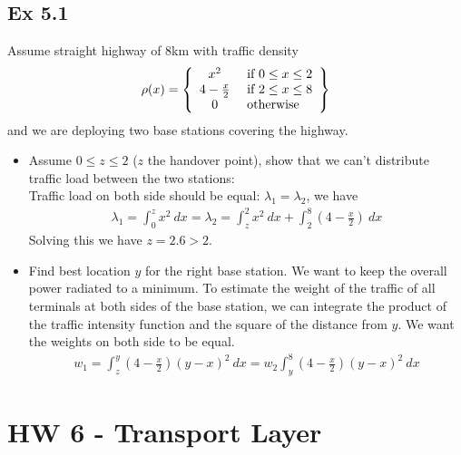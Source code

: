 \subsection*{Ex 5.1}
Assume straight highway of 8km with traffic density
\begin{align*}
 	\rho(x) = 
 		\left\{
 			\begin{array}{c l}
 				x^2 & \text{ if } 0 \leq x \leq 2 \\
 				4 - \frac{x}{2} & \text{ if } 2 \leq x \leq 8 \\
 				0 & \text{ otherwise} 
 			\end{array}
 		\right\}
 \end{align*} 
 and we are deploying two base stations covering the highway.
 \begin{itemize}
 	\item Assume $0 \leq z \leq 2$ ($z$ the handover point), show that we can't distribute traffic load between the two stations: \\
 	Traffic load on both side should be equal: $\lambda_1 = \lambda_2$, we have
 	\begin{align*}
 		\lambda_1 = \int_0^z x^2 \: dx = \lambda_2 = \int_z^2 x^2 \: dx + \int_2^8 (4 - \frac{x}{2}) \: dx
 	\end{align*}
 	Solving this we have $z = 2.6 > 2$.

 	\item Find best location $y$ for the right base station. We want to keep the overall power radiated to a minimum. To estimate the weight of the traffic of all terminals at both sides of the base station, we can integrate the product of the traffic intensity function and the square of the distance from $y$. We want the weights on both side to be equal.
 	\begin{align*}
 		w_1 = \int_z^y (4-\frac{x}{2})(y-x)^2 \: dx = w_2 \int_y^8 (4-\frac{x}{2})(y-x)^2 \: dx
 	\end{align*}
 \end{itemize}



\section*{HW 6 - Transport Layer}

